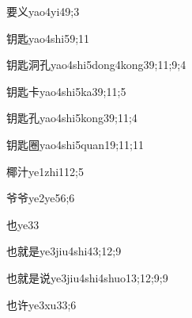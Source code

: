 \begin{verbete}{要义}{yao4yi4}{9;3}
\end{verbete}

\begin{verbete}{钥匙}{yao4shi5}{9;11}
\end{verbete}

\begin{verbete}{钥匙洞孔}{yao4shi5dong4kong3}{9;11;9;4}
\end{verbete}

\begin{verbete}{钥匙卡}{yao4shi5ka3}{9;11;5}
\end{verbete}

\begin{verbete}{钥匙孔}{yao4shi5kong3}{9;11;4}
\end{verbete}

\begin{verbete}{钥匙圈}{yao4shi5quan1}{9;11;11}
\end{verbete}

\begin{verbete}{椰汁}{ye1zhi1}{12;5}
\end{verbete}

\begin{verbete}{爷爷}{ye2ye5}{6;6}
\end{verbete}

\begin{verbete}{也}{ye3}{3}
\end{verbete}

\begin{verbete}{也就是}{ye3jiu4shi4}{3;12;9}
\end{verbete}

\begin{verbete}{也就是说}{ye3jiu4shi4shuo1}{3;12;9;9}
\end{verbete}

\begin{verbete}{也许}{ye3xu3}{3;6}
\end{verbete}

